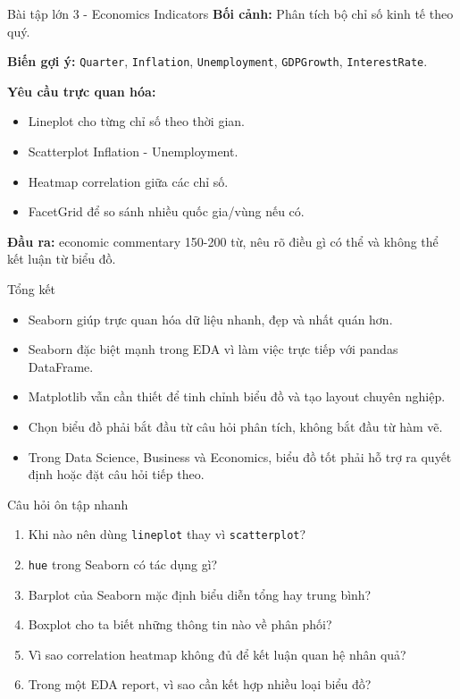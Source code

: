 \documentclass[aspectratio=169,11pt]{beamer}
\begin{document}
\begin{frame}{Bài tập lớn 3 - Economics Indicators}
\textbf{Bối cảnh:} Phân tích bộ chỉ số kinh tế theo quý.

\vspace{0.2cm}
\textbf{Biến gợi ý:} \texttt{Quarter}, \texttt{Inflation}, \texttt{Unemployment}, \texttt{GDPGrowth}, \texttt{InterestRate}.

\vspace{0.2cm}
\textbf{Yêu cầu trực quan hóa:}
\begin{itemize}
    \item Lineplot cho từng chỉ số theo thời gian.
    \item Scatterplot Inflation - Unemployment.
    \item Heatmap correlation giữa các chỉ số.
    \item FacetGrid để so sánh nhiều quốc gia/vùng nếu có.
\end{itemize}

\textbf{Đầu ra:} economic commentary 150-200 từ, nêu rõ điều gì có thể và không thể kết luận từ biểu đồ.
\end{frame}

\begin{frame}{Tổng kết}
\begin{itemize}
    \item Seaborn giúp trực quan hóa dữ liệu nhanh, đẹp và nhất quán hơn.
    \item Seaborn đặc biệt mạnh trong EDA vì làm việc trực tiếp với pandas DataFrame.
    \item Matplotlib vẫn cần thiết để tinh chỉnh biểu đồ và tạo layout chuyên nghiệp.
    \item Chọn biểu đồ phải bắt đầu từ câu hỏi phân tích, không bắt đầu từ hàm vẽ.
    \item Trong Data Science, Business và Economics, biểu đồ tốt phải hỗ trợ ra quyết định hoặc đặt câu hỏi tiếp theo.
\end{itemize}
\end{frame}

\begin{frame}{Câu hỏi ôn tập nhanh}
\begin{enumerate}
    \item Khi nào nên dùng \texttt{lineplot} thay vì \texttt{scatterplot}?
    \item \texttt{hue} trong Seaborn có tác dụng gì?
    \item Barplot của Seaborn mặc định biểu diễn tổng hay trung bình?
    \item Boxplot cho ta biết những thông tin nào về phân phối?
    \item Vì sao correlation heatmap không đủ để kết luận quan hệ nhân quả?
    \item Trong một EDA report, vì sao cần kết hợp nhiều loại biểu đồ?
\end{enumerate}
\end{frame}
\end{document}
